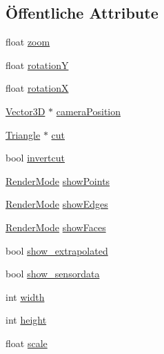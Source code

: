 \subsection*{Öffentliche Attribute}
\begin{DoxyCompactItemize}
\item 
float \hyperlink{structRenderer_1_1Viewport__info_a9bbc5e50fed7334fb237e620e6080e5e}{zoom}
\item 
float \hyperlink{structRenderer_1_1Viewport__info_a80fe2d86956d26105dd8301278e0c4e6}{rotation\-Y}
\item 
float \hyperlink{structRenderer_1_1Viewport__info_ad8005e4eaa631f4c6b96cf6be05e8428}{rotation\-X}
\item 
\hyperlink{classVector3D}{Vector3\-D} $\ast$ \hyperlink{structRenderer_1_1Viewport__info_aa6b5d9d9dbde8c74e25af98680b7ccce}{camera\-Position}
\item 
\hyperlink{classTriangle}{Triangle} $\ast$ \hyperlink{structRenderer_1_1Viewport__info_af6fe77b0bf872e7d65079bb58e9e8cce}{cut}
\item 
bool \hyperlink{structRenderer_1_1Viewport__info_a0e06e17e13e9639179de762f6a45c71e}{invertcut}
\item 
\hyperlink{classRenderer_aa9844470f59e9fdf3aed088936100863}{Render\-Mode} \hyperlink{structRenderer_1_1Viewport__info_ab95af83b6e3e068e14b37187a11709b7}{show\-Points}
\item 
\hyperlink{classRenderer_aa9844470f59e9fdf3aed088936100863}{Render\-Mode} \hyperlink{structRenderer_1_1Viewport__info_a61ce4c293d9dc97da9b4ed2f8f7a36e0}{show\-Edges}
\item 
\hyperlink{classRenderer_aa9844470f59e9fdf3aed088936100863}{Render\-Mode} \hyperlink{structRenderer_1_1Viewport__info_aa1f3f4b18210cf0bc69df0c9015e8acf}{show\-Faces}
\item 
bool \hyperlink{structRenderer_1_1Viewport__info_ac9d99216a6044d7048ba805f9f9b0815}{show\-\_\-extrapolated}
\item 
bool \hyperlink{structRenderer_1_1Viewport__info_abd0ab0f20c5acc43128634b4b4cc1f52}{show\-\_\-sensordata}
\item 
int \hyperlink{structRenderer_1_1Viewport__info_af0617337cfe95f9d5a21420335474bea}{width}
\item 
int \hyperlink{structRenderer_1_1Viewport__info_acd3f381981791f2b012129fe54aee39c}{height}
\item 
float \hyperlink{structRenderer_1_1Viewport__info_a90128db9d24987d94ddd843646a4f03d}{scale}
\end{DoxyCompactItemize}


